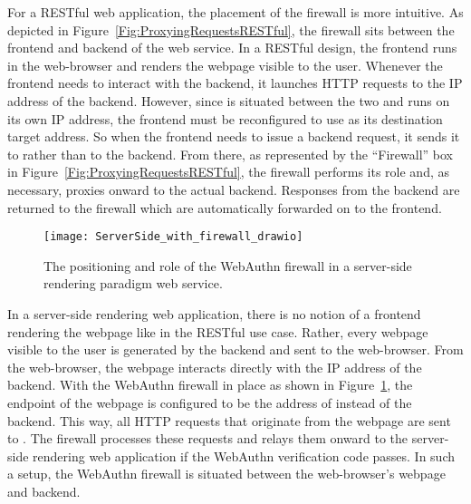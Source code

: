 For a RESTful web application, the placement of the firewall is more intuitive. As depicted in Figure~\ref{Fig:ProxyingRequestsRESTful}, the firewall sits between the frontend and backend of the web service. In a RESTful design, the frontend runs in the web-browser and renders the webpage visible to the user. Whenever the frontend needs to interact with the backend, it launches HTTP requests to the IP address of the backend. However, since \sys{} is situated between the two and runs on its own IP address, the frontend must be reconfigured to use \sys{} as its destination target address. So when the frontend needs to issue a backend request, it sends it to \sys{} rather than to the backend. From there, as represented by the ``Firewall'' box in Figure~\ref{Fig:ProxyingRequestsRESTful}, the firewall performs its role and, as necessary, proxies onward to the actual backend. Responses from the backend are returned to the firewall which are automatically forwarded on to the frontend. 

\begin{figure}[h]
  \centering
  \texttt{[image: ServerSide\_with\_firewall\_drawio]}
  \caption{The positioning and role of the WebAuthn firewall in a server-side rendering paradigm web service.}
  \label{Fig:ProxyingRequestsServerSide}
\end{figure}

In a server-side rendering web application, there is no notion of a frontend rendering the webpage like in the RESTful use case. Rather, every webpage visible to the user is generated by the backend and sent to the web-browser. From the web-browser, the webpage interacts directly with the IP address of the backend. With the WebAuthn firewall in place as shown in Figure~\ref{Fig:ProxyingRequestsServerSide}, the endpoint of the webpage is configured to be the address of \sys{} instead of the backend. This way, all HTTP requests that originate from the webpage are sent to \sys{}. The firewall processes these requests and relays them onward to the server-side rendering web application if the WebAuthn verification code passes. In such a setup, the WebAuthn firewall is situated between the web-browser's webpage and backend.



